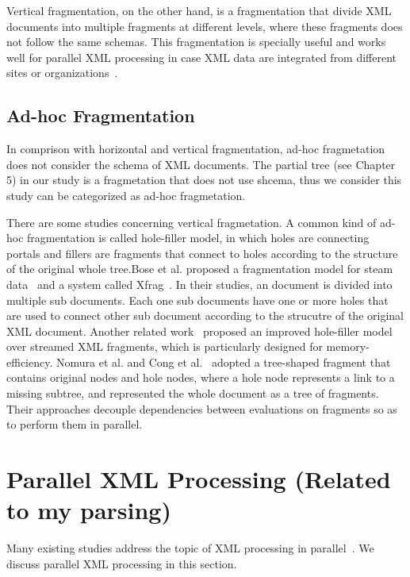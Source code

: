 Vertical fragmentation, on the other hand, is a fragmentation that divide XML
documents into multiple fragments at different levels, where these fragments
does not follow the same schemas. This fragmentation is specially useful and
works well for parallel XML processing in case XML data are integrated from
different sites or organizations~\cite{CFKL12,KlOD10}.


\subsection{Ad-hoc Fragmentation}

In comprison with horizontal and vertical fragmentation, ad-hoc fragmetation
does not consider the schema of XML documents. The partial tree (see Chapter 5)
in our study is a fragmetation that does not use shcema, thus we consider this
study can be categorized as ad-hoc fragmetation.

There are some studies concerning vertical fragmetation. A common kind of ad-hoc
fragmentation is called hole-filler model, in which holes are connecting portals
and fillers are fragments that connect to holes according to the structure of
the original whole tree.Bose et al. proposed a fragmentation model for steam
data~\cite{bose2003query} and a system called Xfrag~\cite{bose2005xfrag}. In
their studies, an document is divided into multiple sub documents. Each one sub
documents have one or more holes that are used to connect other sub document
according to the strucutre of the original XML document. Another related
work~\cite{lee2012memory}  proposed an improved hole-filler model over streamed
XML fragments, which is particularly designed for memory-efficiency. Nomura et
al. \cite{NEMH07} and Cong et al.~\cite{CFKL12} adopted a tree-shaped fragment
that contains original nodes and hole nodes, where a hole node represents a link
to a missing subtree, and represented the whole document as a tree of fragments.
Their approaches decouple dependencies between evaluations on fragments so as to
perform them in parallel.



\section{Parallel XML Processing (Related to my parsing)}
\label{sec:paralleleval}

Many existing studies address the topic of XML processing in
parallel~\cite{BoLS09,PaZC08,LuGa08,Mats09,SAFu05}. We discuss parallel XML
processing in this section.

